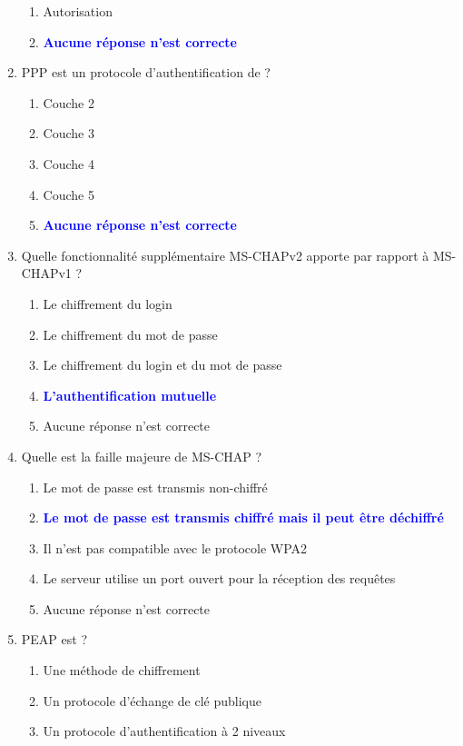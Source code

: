 \documentclass[a4paper]{article}
\begin{document}
\begin{enumerate}
\begin{enumerate}
        \item Autorisation
        \item \textcolor{blue}{\textbf{Aucune réponse n'est correcte}}
    \end{enumerate}
    \item PPP est un protocole d'authentification de ?
    \begin{enumerate}
        \item Couche 2
        \item Couche 3
        \item Couche 4
        \item Couche 5
        \item \textcolor{blue}{\textbf{Aucune réponse n'est correcte}}
    \end{enumerate}
    \item Quelle fonctionnalité supplémentaire MS-CHAPv2 apporte par rapport à MS-CHAPv1 ?
    \begin{enumerate}
        \item Le chiffrement du login
        \item Le chiffrement du mot de passe
        \item Le chiffrement du login et du mot de passe
        \item \textcolor{blue}{\textbf{L'authentification mutuelle}}
        \item Aucune réponse n'est correcte
    \end{enumerate}
    \item Quelle est la faille majeure de MS-CHAP ?
    \begin{enumerate}
        \item Le mot de passe est transmis non-chiffré
        \item \textcolor{blue}{\textbf{Le mot de passe est transmis chiffré mais il peut être déchiffré}}
        \item Il n'est pas compatible avec le protocole WPA2
        \item Le serveur utilise un port ouvert pour la réception des requêtes
        \item Aucune réponse n'est correcte
    \end{enumerate}
    \item PEAP est ?
    \begin{enumerate}
        \item Une méthode de chiffrement
        \item Un protocole d'échange de clé publique
        \item Un protocole d'authentification à 2 niveaux

\end{enumerate}
\end{enumerate}
\end{document}
